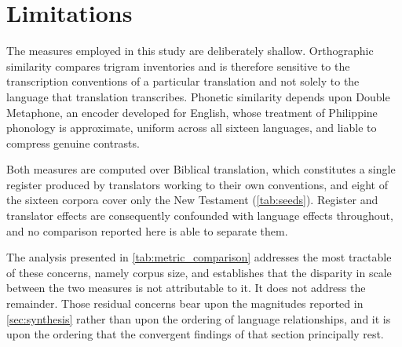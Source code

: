 \section*{Limitations}
\label{sec:limitations}

The measures employed in this study are deliberately shallow. Orthographic
similarity compares trigram inventories and is therefore sensitive to the
transcription conventions of a particular translation and not solely to the
language that translation transcribes. Phonetic similarity depends upon Double
Metaphone, an encoder developed for English, whose treatment of Philippine
phonology is approximate, uniform across all sixteen languages, and liable to
compress genuine contrasts.

Both measures are computed over Biblical translation, which constitutes a single
register produced by translators working to their own conventions, and eight of
the sixteen corpora cover only the New Testament (\cref{tab:seeds}). Register
and translator effects are consequently confounded with language effects
throughout, and no comparison reported here is able to separate them.

The analysis presented in \cref{tab:metric_comparison} addresses the most
tractable of these concerns, namely corpus size, and establishes that the
disparity in scale between the two measures is not attributable to it. It does
not address the remainder. Those residual concerns bear upon the magnitudes
reported in \cref{sec:synthesis} rather than upon the ordering of language
relationships, and it is upon the ordering that the convergent findings of that
section principally rest.
